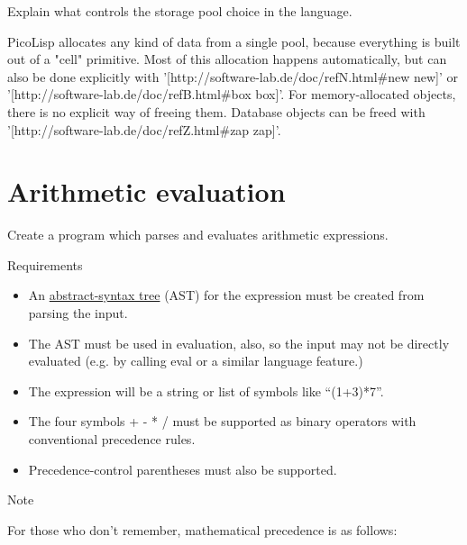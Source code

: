 Explain what controls the storage pool choice in the language.



\begin{wideverbatim}

PicoLisp allocates any kind of data from a single pool, because everything
is built out of a "cell" primitive. Most of this allocation happens
automatically, but can also be done explicitly with
'[http://software-lab.de/doc/refN.html#new new]' or
'[http://software-lab.de/doc/refB.html#box box]'. For memory-allocated
objects, there is no explicit way of freeing them. Database objects can be
freed with '[http://software-lab.de/doc/refZ.html#zap zap]'.

\end{wideverbatim}

\pagebreak{}
\section*{Arithmetic evaluation}


Create a program which parses and evaluates arithmetic expressions.

\begin{description}
\item[Requirements]
\end{description}

\begin{itemize}
\item
  An
  \href{http://en.wikipedia.org/wiki/Abstract\_syntax\_tree}{abstract-syntax
  tree} (AST) for the expression must be created from parsing the input.
\item
  The AST must be used in evaluation, also, so the input may not be
  directly evaluated (e.g. by calling eval or a similar language
  feature.)
\item
  The expression will be a string or list of symbols like ``(1+3)*7''.
\item
  The four symbols + - * / must be supported as binary operators with
  conventional precedence rules.
\item
   Precedence-control parentheses must also be supported.
\end{itemize}

\begin{description}
\item[Note]
\end{description}

For those who don't remember, mathematical precedence is as follows:


